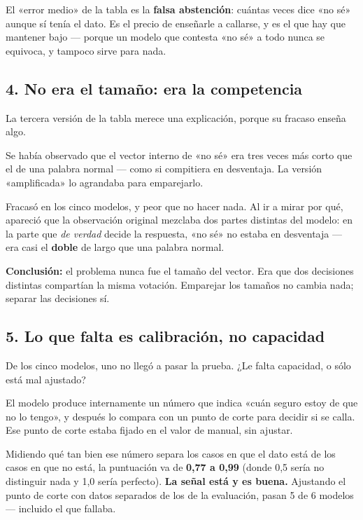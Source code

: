 \documentclass[11pt,a4paper]{article}
\begin{document}
El «error medio» de la tabla es la \textbf{falsa abstención}: cuántas veces dice «no sé» aunque
sí tenía el dato. Es el precio de enseñarle a callarse, y es el que hay que mantener bajo ---
porque un modelo que contesta «no sé» a todo nunca se equivoca, y tampoco sirve para nada.

\subsection{4. No era el tamaño: era la competencia}

La tercera versión de la tabla merece una explicación, porque su fracaso enseña algo.

Se había observado que el vector interno de «no sé» era tres veces más corto que el de una
palabra normal --- como si compitiera en desventaja. La versión «amplificada» lo agrandaba para
emparejarlo.

Fracasó en los cinco modelos, y peor que no hacer nada. Al ir a mirar por qué, apareció que la
observación original mezclaba dos partes distintas del modelo: en la parte que \emph{de verdad}
decide la respuesta, «no sé» no estaba en desventaja --- era casi el \textbf{doble} de largo que
una palabra normal.

\begin{caja}
\textbf{Conclusión:} el problema nunca fue el tamaño del vector. Era que dos decisiones distintas
compartían la misma votación. Emparejar los tamaños no cambia nada; separar las decisiones sí.
\end{caja}

\subsection{5. Lo que falta es calibración, no capacidad}

De los cinco modelos, uno no llegó a pasar la prueba. ¿Le falta capacidad, o sólo está mal
ajustado?

El modelo produce internamente un número que indica «cuán seguro estoy de que no lo tengo», y
después lo compara con un punto de corte para decidir si se calla. Ese punto de corte estaba
fijado en el valor de manual, sin ajustar.

Midiendo qué tan bien ese número separa los casos en que el dato está de los casos en que no
está, la puntuación va de \textbf{0,77 a 0,99} (donde 0,5 sería no distinguir nada y 1,0 sería
perfecto). \textbf{La señal está y es buena.} Ajustando el punto de corte con datos separados de
los de la evaluación, pasan 5 de 6 modelos --- incluido el que fallaba.
\end{document}
